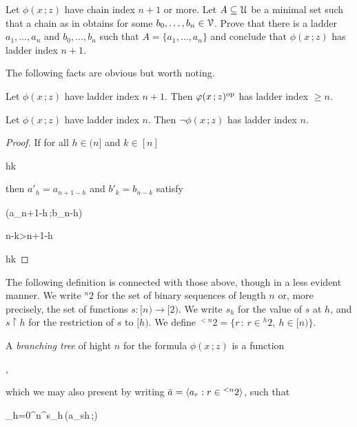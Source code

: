 \documentclass[scombinatorics.tex]{subfiles}
\begin{document}
\begin{exercise}
  Let $\phi(x\,;z)$ have chain index $n+1$ or more. 
  Let $A\subseteq\U$ be a minimal set such that a chain as in  obtains for some $b_0,\dots,b_n\in\V$.
  Prove that there is a ladder $a_1,\dots,a_n$ and $b_0,\dots,b_n$ such that $A=\{a_1,\dots,a_n\}$ and conclude that $\phi(x\,;z)$ has ladder index $n+1$.\QED
\end{exercise}

The following facts are obvious but worth noting.

\begin{fact}\label{fact_stability_dual}
  Let $\phi(x\,;z)$ have ladder index $n+1$. 
  Then $\phi(x\,;z)^{\rm op}$ has ladder index $\ge n$.\QED
\end{fact}
 
\begin{fact}\label{fact_stability_neg}
  Let $\phi(x\,;z)$ have ladder index $n$. 
  Then $\neg\phi(x\,;z)$ has ladder index $n$.\QED
\end{fact}

\begin{proof}
  If for all $h\in(n]$ and $k\in[n]$ 

  {\IFF}
  {h\le k}

  then $a'_h=a_{n+1-h}$ and $b'_k=b_{n-k}$ satisfy

  {\IFF}
  {\phi(a_{n+1-h}\,;b_{n-h})}

  \ceq{}
  {\IFF}
  {n-k>n+1-h}

  \ceq{}
  {\IFF}
  {h\le k}
\end{proof}
 
The following definition is connected with those above, though in a less evident manner.
We write ${}^n2$ for the set of binary sequences of length $n$ or, more precisely, the set of functions $s:[n)\to[2)$.
We write $s_h$ for the value of $s$ at $h$, and $s{\restriction} h$ for the restriction of $s$ to $[h)$.
We define ${}^{<n}2=\big\{r\, :\, r\in {}^h2,\ h\in[n)\big\}$.

A \emph{branching tree\/} of hight $n$ for the formula $\phi(x\,;z)$ is a function 

\nopagebreak[4]\par
{},

which we may also present by writing $\bar a=\<a_r:r\in{}^{<n}2\>$, such that

{\neq}
{\bigcap_{h=0}^n\neg^{s_h}\,\phi(a_{s\restriction h}\,;\V)}
\end{document}
